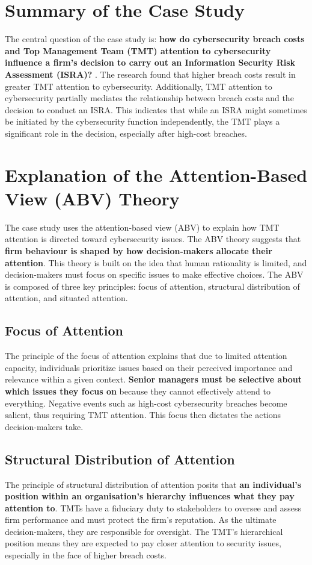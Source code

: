 \section{Summary of the Case Study}
The central question of the case study is: \textbf{how do cybersecurity breach costs and Top Management Team (TMT) attention to cybersecurity influence a firm's decision to carry out an Information Security Risk Assessment (ISRA)?} \citep{shaikh2023information}. The research found that higher breach costs result in greater TMT attention to cybersecurity. Additionally, TMT attention to cybersecurity partially mediates the relationship between breach costs and the decision to conduct an ISRA. This indicates that while an ISRA might sometimes be initiated by the cybersecurity function independently, the TMT plays a significant role in the decision, especially after high-cost breaches.

\section{Explanation of the Attention-Based View (ABV) Theory}
The case study uses the attention-based view (ABV) to explain how TMT attention is directed toward cybersecurity issues. The ABV theory suggests that \textbf{firm behaviour is shaped by how decision-makers allocate their attention}. This theory is built on the idea that human rationality is limited, and decision-makers must focus on specific issues to make effective choices. The ABV is composed of three key principles: focus of attention, structural distribution of attention, and situated attention.
\subsection{Focus of Attention}
The principle of the focus of attention explains that due to limited attention capacity, individuals prioritize issues based on their perceived importance and relevance within a given context. \textbf{Senior managers must be selective about which issues they focus on} because they cannot effectively attend to everything. Negative events such as high-cost cybersecurity breaches become salient, thus requiring TMT attention. This focus then dictates the actions decision-makers take.
\subsection{Structural Distribution of Attention}
The principle of structural distribution of attention posits that \textbf{an individual's position within an organisation's hierarchy influences what they pay attention to}. TMTs have a fiduciary duty to stakeholders to oversee and assess firm performance and must protect the firm's reputation. As the ultimate decision-makers, they are responsible for oversight. The TMT’s hierarchical position means they are expected to pay closer attention to security issues, especially in the face of higher breach costs.
